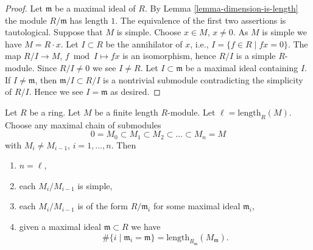 \begin{proof}
Let $\mathfrak m$ be a maximal ideal of $R$.
By Lemma \ref{lemma-dimension-is-length} the module
$R/\mathfrak m$ has length $1$. The equivalence of
the first two assertions is tautological.
Suppose that $M$ is simple. Choose $x \in M$, $x \not = 0$.
As $M$ is simple we have $M = R \cdot x$.
Let $I \subset R$ be the annihilator of $x$, i.e.,
$I = \{f \in R \mid fx = 0\}$. The map $R/I \to M$,
$f \bmod I \mapsto fx$ is an isomorphism, hence
$R/I$ is a simple $R$-module. Since $R/I \not = 0$ we see $I \not = R$.
Let $I \subset \mathfrak m$ be a maximal ideal containing $I$.
If $I \not = \mathfrak m$, then $\mathfrak m /I \subset R/I$
is a nontrivial submodule contradicting the simplicity
of $R/I$. Hence we see $I = \mathfrak m$ as desired.
\end{proof}

\begin{lemma}
\label{lemma-simple-pieces}
Let $R$ be a ring. Let $M$ be a finite length $R$-module.
Let $\ell = \text{length}_R(M)$. Choose any maximal chain of
submodules
$$
0 = M_0 \subset M_1 \subset M_2 \subset \ldots \subset M_n = M
$$
with $M_i \not = M_{i-1}$, $i = 1, \ldots, n$. Then
\begin{enumerate}
\item $n = \ell$,
\item each $M_i/M_{i-1}$ is simple,
\item each $M_i/M_{i-1}$ is of the form
$R/\mathfrak m_i$ for some maximal ideal $\mathfrak m_i$,
\item given a maximal ideal $\mathfrak m \subset R$
we have
$$
\# \{i \mid \mathfrak m_i = \mathfrak m\}
=
\text{length}_{R_{\mathfrak m}} (M_{\mathfrak m}).
$$
\end{enumerate}
\end{lemma}

